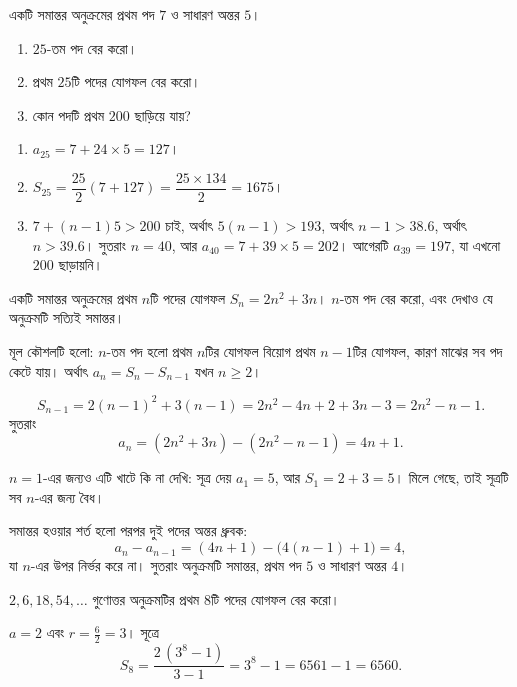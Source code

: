 \documentclass[11pt]{article}
\begin{document}
 একটি সমান্তর অনুক্রমের প্রথম পদ $7$ ও সাধারণ অন্তর $5$।
\begin{enumerate}
  \item $25$-তম পদ বের করো।
  \item প্রথম $25$টি পদের যোগফল বের করো।
  \item কোন পদটি প্রথম $200$ ছাড়িয়ে যায়?
\end{enumerate}

\begin{sol}
\begin{enumerate}
  \item $a_{25} = 7 + 24 \times 5 = 127$।
  \item $S_{25} = \dfrac{25}{2}(7 + 127) = \dfrac{25 \times 134}{2} = 1675$।
  \item $7 + (n-1)5 > 200$ চাই, অর্থাৎ $5(n-1) > 193$, অর্থাৎ
        $n - 1 > 38.6$, অর্থাৎ $n > 39.6$। সুতরাং $n = 40$, আর
        $a_{40} = 7 + 39 \times 5 = 202$। আগেরটি $a_{39} = 197$, যা এখনো
        $200$ ছাড়ায়নি।
\end{enumerate}
\end{sol}

 একটি সমান্তর অনুক্রমের প্রথম $n$টি পদের যোগফল $S_n = 2n^{2} + 3n$।
$n$-তম পদ বের করো, এবং দেখাও যে অনুক্রমটি সত্যিই সমান্তর।

\begin{sol}
মূল কৌশলটি হলো: $n$-তম পদ হলো প্রথম $n$টির যোগফল বিয়োগ প্রথম $n-1$টির যোগফল,
কারণ মাঝের সব পদ কেটে যায়। অর্থাৎ $a_n = S_n - S_{n-1}$ যখন $n \geq 2$।

\[
  S_{n-1} = 2(n-1)^{2} + 3(n-1) = 2n^{2} - 4n + 2 + 3n - 3 = 2n^{2} - n - 1 .
\]
সুতরাং
\[
  a_n = (2n^{2} + 3n) - (2n^{2} - n - 1) = 4n + 1 .
\]

$n = 1$-এর জন্যও এটি খাটে কি না দেখি: সূত্র দেয় $a_1 = 5$, আর
$S_1 = 2 + 3 = 5$। মিলে গেছে, তাই সূত্রটি সব $n$-এর জন্য বৈধ।

সমান্তর হওয়ার শর্ত হলো পরপর দুই পদের অন্তর ধ্রুবক:
\[
  a_n - a_{n-1} = (4n+1) - \big( 4(n-1) + 1 \big) = 4 ,
\]
যা $n$-এর উপর নির্ভর করে না। সুতরাং অনুক্রমটি সমান্তর, প্রথম পদ $5$ ও সাধারণ
অন্তর $4$।
\end{sol}

 $2, 6, 18, 54, \dots$ গুণোত্তর অনুক্রমটির প্রথম $8$টি পদের যোগফল বের
করো।

\begin{sol}
$a = 2$ এবং $r = \tfrac{6}{2} = 3$। সূত্রে
\[
  S_8 = \frac{2\,(3^{8} - 1)}{3 - 1} = 3^{8} - 1 = 6561 - 1 = 6560 .
\]
\end{sol}
\end{document}
